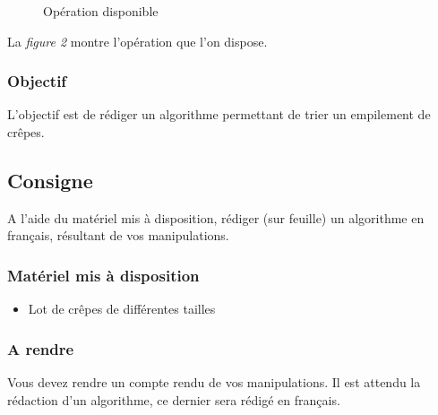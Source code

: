 \documentclass[10pt,]{article}
\providecommand{\tightlist}{%
  \setlength{\itemsep}{0pt}\setlength{\parskip}{0pt}}
\begin{document}
\begin{figure}
    \centering
    \caption{Opération disponible}
\end{figure}

La \emph{figure 2} montre l'opération que l'on
dispose.

\hypertarget{objectif}{%
\subsubsection{Objectif}\label{objectif}}

L'objectif est de rédiger un algorithme permettant de trier un
empilement de crêpes.

\hypertarget{consigne}{%
\subsection{Consigne}\label{consigne}}

A l'aide du matériel mis à disposition, rédiger (sur feuille) un
algorithme en français, résultant de vos manipulations.

\hypertarget{matuxe9riel-mis-uxe0-disposition}{%
\subsubsection{Matériel mis à
disposition}\label{matuxe9riel-mis-uxe0-disposition}}

\begin{itemize}
\tightlist
\item
  Lot de crêpes de différentes tailles
\end{itemize}

\hypertarget{a-rendre}{%
\subsubsection{A rendre}\label{a-rendre}}

Vous devez rendre un compte rendu de vos manipulations. Il est attendu
la rédaction d'un algorithme, ce dernier sera rédigé en français.
\end{document}
